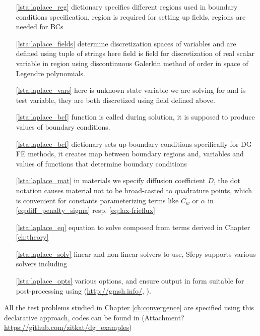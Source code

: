 \begin{itemize}
	\item[\ref{lsta:laplace_reg}]  dictionary specifies different 
	regions 
	used in	boundary conditions specification,  region is required for 
	setting up fields,  regions are needed for BCs
	\item[\ref{lsta:laplace_fields}]   determine discretization spaces of 
	variables and are defined using tuple of strings
	 here field  is field for discretization of real scalar 
	variable in region  using discontinuous Galerkin method of order 
	 in space of Legendre polynomials. 
	\item[\ref{lsta:laplace_vars}]  here  is unknown state variable we are 
	solving for and  is test variable, they are both discretized using field 
	 defined above.
	\item[\ref{lsta:laplace_bcf}]  function  is called during solution, it 
	is supposed to produce values of boundary conditions.
	\item[\ref{lsta:laplace_bcf}]  dictionary sets up boundary 
	conditions specifically for DG FE methods, it creates map between boundary regions 
	and, variables and values of functions that determine boundary conditions
	\item[\ref{lsta:laplace_mat}] in materials we specify diffusion 
	coefficient $D$, the dot notation  
	causes material not to be broad-casted to quadrature points, which is convenient for 
	constants parameterizing terms like $C_w$ or $\alpha$ in 
	\eqref{eq:diff_penalty_sigma} 
	resp. \eqref{eq:lax-frieflux}
	\item[\ref{lsta:laplace_eq}] equation to solve composed from terms derived in 
	Chapter \ref{ch:theory}
	
	\item[\ref{lsta:laplace_solv}] linear and non-linear solvers to use, Sfepy supports 
	various solvers including  \cite{MUMPS:2}
	
	\item[\ref{lsta:laplace_opts}] various options,  and 
	 ensure output in form suitable for 
	post-processing 
	using  (\url{http://gmsh.info/}, \cite{Remacle2007}).
\end{itemize}
All the test problems studied in Chapter \ref{ch:convergence} are specified using this 
declarative approach, codes can be found in (\todo Attachment? 
\url{https://github.com/zitkat/dg_examples})

